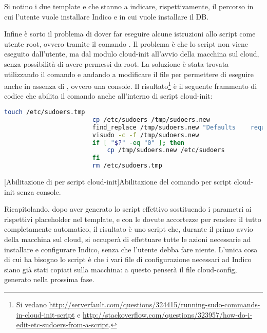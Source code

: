             Si notino i due template  e  che stanno a indicare, rispettivamente, il percorso in cui l'utente vuole installare Indico e in cui vuole installare il \ac{DB}.
            
            Infine è sorto il problema di dover far eseguire alcune istruzioni allo script come utente root, ovvero tramite il comando . Il problema è che lo script non viene eseguito dall'utente, ma dal modulo cloud-init all'avvio della macchina sul cloud, senza possibilità di avere permessi da root. La soluzione è stata trovata utilizzando il comando  e andando a modificare il file  per permettere di eseguire  anche in assenza di , ovvero una console. Il risultato\footnote{Si vedano \url{http://serverfault.com/questions/324415/running-sudo-commands-in-cloud-init-script} e \url{http://stackoverflow.com/questions/323957/how-do-i-edit-etc-sudoers-from-a-script}.} è il seguente frammento di codice che abilita il comando  anche all'interno di script cloud-init:
            
            \begin{center}
                \begin{minipage}{\linewidth}
                    \begin{lstlisting}[language=bash, gobble=22]
                        touch /etc/sudoers.tmp
                        cp /etc/sudoers /tmp/sudoers.new
                        find_replace /tmp/sudoers.new "Defaults    requiretty" "Defaults    !requiretty"
                        visudo -c -f /tmp/sudoers.new
                        if [ "$?" -eq "0" ]; then
                            cp /tmp/sudoers.new /etc/sudoers
                        fi
                        rm /etc/sudoers.tmp
                    \end{lstlisting}
                    \captionsetup{textformat=empty,labelformat=empty} \vspace{-2em}
                    [Abilitazione di  per script cloud-init]{Abilitazione del comando  per script cloud-init senza console.}
                \end{minipage}
            \end{center}
            
            Ricapitolando, dopo aver generato lo script effettivo sostituendo i parametri ai rispettivi placeholder nel template, e con le dovute accortezze per rendere il tutto completamente automatico, il risultato è uno script che, durante il primo avvio della macchina sul cloud, si occuperà di effettuare tutte le azioni necessarie ad installare e configurare Indico, senza che l'utente debba fare niente. L'unica cosa di cui ha bisogno lo script è che i vari file di configurazione necessari ad Indico siano già stati copiati sulla macchina: a questo penserà il file cloud-config, generato nella prossima fase.
        
